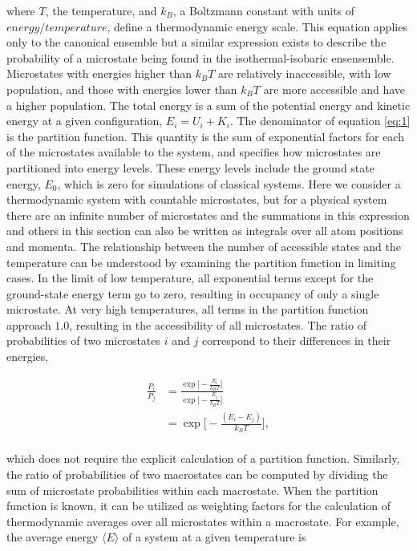 \begin{refsection}
where $T$, the temperature, and $k_B$, a Boltzmann constant with units of $energy/temperature$, define a thermodynamic energy scale. This equation applies only to the canonical ensemble but a similar expression exists to describe the probability of a microstate being found in the isothermal-isobaric ensensemble. Microstates with energies higher than $k_B T$ are relatively inaccessible, with low population, and those with energies lower than $k_B T$ are more accessible and have a higher population. The total energy is a sum of the potential energy and kinetic energy at a given configuration, $E_{i}=U_{i}+K_{i}$. The denominator of equation \ref{eq:1} is the partition function. This quantity is the sum of exponential factors for each of the microstates available to the system, and specifies how microstates are partitioned into energy levels. These energy levels include the ground state energy, $E_0$, which is zero for simulations of classical systems. Here we consider a thermodynamic system with countable microstates, but for a physical system there are an infinite number of microstates and the summations in this expression and others in this section can also be written as integrals over all atom positions and momenta. The relationship between the number of accessible states and the temperature can be understood by examining the partition function in limiting cases. In the limit of low temperature, all exponential terms except for the ground-state energy term go to zero, resulting in occupancy of only a single microstate. At very high temperatures, all terms in the partition function approach $1.0$, resulting in the accessibility of all microstates. The ratio of probabilities of two microstates $i$ and $j$ correspond to their differences in their energies,

\begin{equation}
\label{eq:2}
\begin{split}
\frac{P_i}{P_j} & = \frac{ \exp \big[ - \frac{E_{i}}{k_B T}\big]  }{  \exp \big[ - \frac{E_{j}}{k_B T}\big]   } \\
                       & = \exp \Big[ - \frac{(E_{i} - E_{j})}{k_B T}\Big], \\
\end{split}
\end{equation}

which does not require the explicit calculation of a partition function. Similarly, the ratio of probabilities of two macrostates can be computed by dividing the sum of microstate probabilities within each macrostate. When the partition function is known, it can be utilized as weighting factors for the calculation of thermodynamic averages over all microstates within a macrostate. For example, the average energy $\langle E \rangle$ of a system at a given temperature is


\end{refsection}
